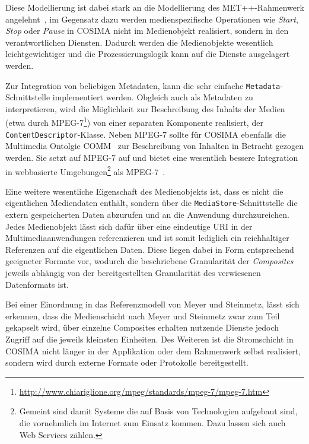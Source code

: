   Diese Modellierung ist dabei stark an die Modellierung des MET++-Rahmenwerk angelehnt~\citep[S. 75]{ackermann1996doo}, im Gegensatz dazu werden medienspezifische Operationen wie \emph{Start}, \emph{Stop} oder \emph{Pause} in COSIMA nicht im Medienobjekt realisiert, sondern in den verantwortlichen Diensten. Dadurch werden die Medienobjekte wesentlich leichtgewichtiger und die Prozessierungslogik kann auf die Dienste ausgelagert werden.
  
  
  Zur Integration von beliebigen Metadaten, kann die sehr einfache \verb!Metadata!-Schnittstelle implementiert werden. Obgleich auch als Metadaten zu interpretieren, wird die Möglichkeit zur Beschreibung des Inhalts der Medien (etwa durch MPEG-7\footnote{\url{http://www.chiariglione.org/mpeg/standards/mpeg-7/mpeg-7.htm}}) von einer separaten Komponente realisiert, der \verb!ContentDescriptor!-Klasse. Neben MPEG-7 sollte für COSIMA ebenfalls die Multimedia Ontolgie COMM~\citep{arndt2007cdw} zur Beschreibung von Inhalten in Betracht gezogen werden. Sie setzt auf MPEG-7 auf und bietet eine wesentlich bessere Integration in webbasierte Umgebungen\footnote{Gemeint sind damit Systeme die auf Basis von Technologien aufgebaut sind, die vornehmlich im Internet zum Einsatz kommen. Dazu lassen sich auch Web Services zählen.} als MPEG-7~\citep[S. 31]{arndt2007cdw}.
  
  Eine weitere wesentliche Eigenschaft des Medienobjekts ist, dass es nicht die eigentlichen Mediendaten enthält, sondern über die \verb!MediaStore!-Schnittstelle die extern gespeicherten Daten abzurufen und an die Anwendung durchzureichen. Jedes Medienobjekt lässt sich dafür über eine eindeutige URI in der Multimediaanwendungen referenzieren und ist somit lediglich ein reichhaltiger Referenzen auf die eigentlichen Daten. Diese liegen dabei in Form entsprechend geeigneter Formate vor, wodurch die beschriebene Granularität der \emph{Composites} jeweils abhängig von der bereitgestellten Granularität des verwiesenen Datenformats ist.
  
  Bei einer Einordnung in das Referenzmodell von Meyer und Steinmetz, lässt sich erkennen, dass die Medienschicht nach Meyer und Steinmetz zwar zum Teil gekapselt wird, über einzelne Composites erhalten nutzende Dienste jedoch Zugriff auf die jeweils kleinsten Einheiten. Des Weiteren ist die Stromschicht  in COSIMA nicht länger in der Applikation oder dem Rahmenwerk selbst realisiert, sondern wird durch externe Formate oder Protokolle bereitgestellt.
  
